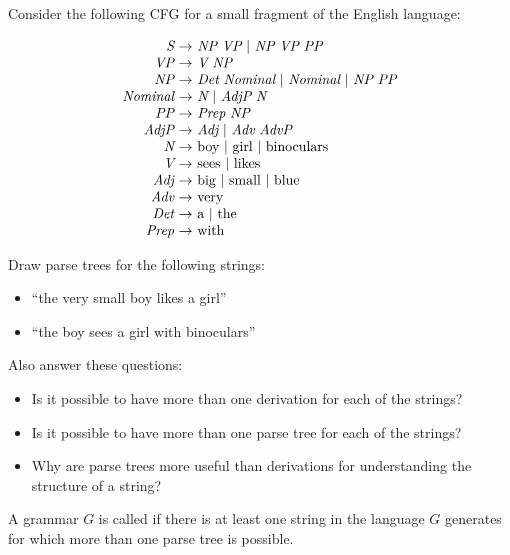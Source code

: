 \documentclass[twoside,letterpaper,openany]{book}
\begin{document}
\begin{exer}\label{exer:cfgenglish}
Consider the following CFG for a small fragment of the English language:

\[\begin{array}{r@{\ \to\ }l}
\textit{S} & \textit{NP} \ \textit{VP} \ |\  \textit{NP} \ \textit{VP}\ \textit{PP} \\
\textit{VP} & \textit{V}\ \textit{NP} \\
\textit{NP} & \textit{Det}\ \textit{Nominal} \ |\ \textit{Nominal} \ |\ \textit{NP}\ \textit{PP}\\
\textit{Nominal} &  \textit{N}  \ |\ \textit{AdjP}\ \textit{N} \\
\textit{PP} & \textit{Prep}\ \textit{NP} \\
\textit{AdjP} & \textit{Adj} \ |\ \textit{Adv}\ \textit{AdvP} \\
\textit{N} & \textrm{boy} \ |\ \textrm{girl} \ |\ \textrm{binoculars}\\
\textit{V} & \textrm{sees} \ |\ \textrm{likes} \\
\textit{Adj} & \textrm{big} \ |\ \textrm{small} \ |\ \textrm{blue}\\
\textit{Adv} & \textrm{very} \\
\textit{Det} & \textrm{a} \ |\ \textrm{the} \\
\textit{Prep} & \textrm{with}
\end{array}\]

Draw parse trees for the following strings:
\begin{itemize}
\item ``the very small boy likes a girl''
\item ``the boy sees a girl with binoculars''
\end{itemize}

Also answer these questions:
\begin{itemize}
\item Is it possible to have more than one derivation for each of the strings? 
\item Is it possible to have more than one parse tree for each of the strings? 
\item Why are parse trees more useful than derivations for understanding the structure of a string?
\end{itemize}
\end{exer}

\begin{defn}
A grammar $G$ is called  if there is at least one string in the language $G$ generates for which more than one parse tree is possible.
\end{defn}
\end{document}
